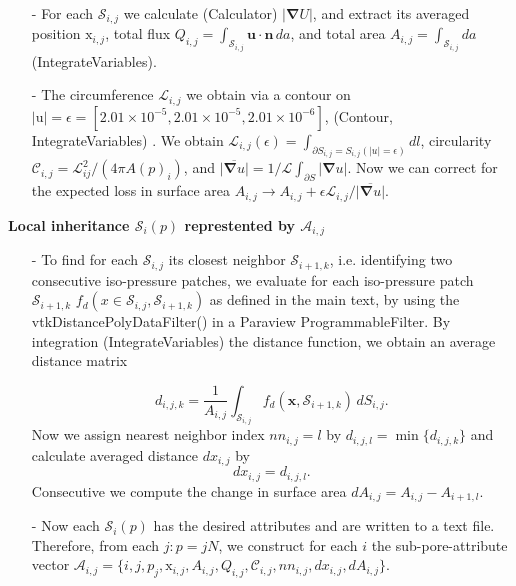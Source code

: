 \documentclass[draft,jgrga]{agutexSI2019}
\begin{document}
\begin{article}
\begin{itemize}
	\item[-]For each $\mathcal{S}_{i,j}$ we calculate (Calculator) $\left|\mathbf{\nabla}U\right|$, and extract its averaged position $\mathrm{x}_{i,j}$, total flux $Q_{i,j} = \int_{\mathcal{S}_{i,j}}\mathbf{u}\cdot\mathbf{n}\,da$, and total area $A_{i,j}= \int_{\mathcal{S}_{i,j}}da$ (IntegrateVariables). 
	\item[-] The circumference $\mathcal{L}_{i,j}$ we obtain via a contour on $|\mathrm{u}| = \epsilon =[2.01\times 10^{-5},2.01\times 10^{-5},2.01\times 10^{-6}]$, (Contour, IntegrateVariables) . We obtain $\mathcal{L}_{i,j}(\epsilon)=\int_{\partial S_{i,j}=S_{i,j}(|u|=\epsilon)}dl$, circularity $\mathcal{C}_{i,j} = \mathcal{L}_{ij}^2/(4\pi A(p)_i)$, and $\overline{\left|\mathbf{\nabla}u\right|}= 1/\mathcal{L}\int_{\partial S}\left|\mathbf{\nabla}u\right|$. Now we can correct for the expected loss in surface area $A_{i,j}\longrightarrow A_{i,j}+\epsilon \mathcal{L}_{i,j}/\overline{\left|\mathbf{\nabla}u\right|}$.
\end{itemize}

\noindent\textbf{Local inheritance $\mathcal{S}_i(p)$ represtented by $\mathcal{A}_{i,j}$}
\begin{itemize}

	\item[-] To find for each $\mathcal{S}_{i,j}$ its closest neighbor $\mathcal{S}_{i+1,k}$, i.e. identifying two consecutive iso-pressure patches, we evaluate for each iso-pressure patch $\mathcal{S}_{i+1,k}$ $f_d(x\in \mathcal{S}_{i,j},\mathcal{S}_{i+1,k})$ as defined in the main text, by using the vtkDistancePolyDataFilter() in a Paraview ProgrammableFilter. By integration (IntegrateVariables) the distance function, we obtain an average distance matrix 

	\begin{equation}
		d_{i,j,k} = \frac{1}{A_{i,j}}\int_{\mathcal{S}_{i,j} }f_d(\mathbf{x},\mathcal{S}_{i+1,k}) \,dS_{i,j}.
	\end{equation}
	Now we assign nearest neighbor index $nn_{i,j} = l$ by $d_{i,j,l} = \min\{d_{i,j,k}\}$ and calculate averaged distance $dx_{i,j}$ by 
	\begin{equation}
		dx_{i,j} = d_{i,j,l}. 
	\end{equation}
	Consecutive we compute the change in surface area $dA_{i,j} = A_{i,j}-A_{i+1,l}$.

	\item[-] Now each $\mathcal{S}_i(p)$ has the desired attributes and are written to a text file. Therefore, from each $j: p = jN$, we construct for each $i$ the sub-pore-attribute vector $\mathcal{A}_{i,j} =\{ i, j, p_j, \mathrm{x}_{i,j} , A_{i,j}, Q_{i,j}, \mathcal{C}_{i,j}, nn_{i,j}, dx_{i,j}, dA_{i,j} \}$. 
\end{itemize}



\end{article}
\end{document}
